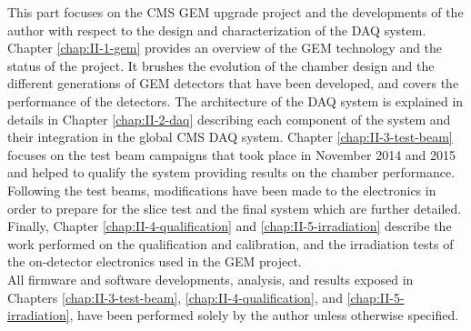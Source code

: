 This part focuses on the CMS GEM upgrade project and the developments of the author with respect to the design and characterization of the DAQ system. Chapter \ref{chap:II-1-gem} provides an overview of the GEM technology and the status of the project. It brushes the evolution of the chamber design and the different generations of GEM detectors that have been developed, and covers the performance of the detectors. The architecture of the DAQ system is explained in details in Chapter \ref{chap:II-2-daq} describing each component of the system and their integration in the global CMS DAQ system. Chapter \ref{chap:II-3-test-beam} focuses on the test beam campaigns that took place in November 2014 and 2015 and helped to qualify the system providing results on the chamber performance. Following the test beams, modifications have been made to the electronics in order to prepare for the slice test and the final system which are further detailed. Finally, Chapter \ref{chap:II-4-qualification} and \ref{chap:II-5-irradiation} describe the work performed on the qualification and calibration, and the irradiation tests of the on-detector electronics used in the GEM project. \\

All firmware and software developments, analysis, and results exposed in Chapters \ref{chap:II-3-test-beam}, \ref{chap:II-4-qualification}, and \ref{chap:II-5-irradiation}, have been performed solely by the author unless otherwise specified.
